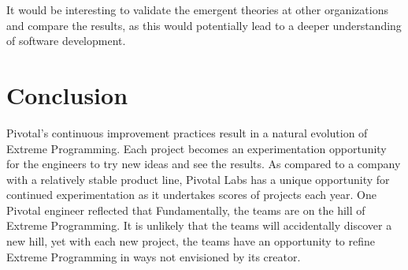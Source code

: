 It would be interesting to validate the emergent theories at other organizations and compare the results, as this would potentially lead to a deeper understanding of software development. 
\section{Conclusion}
Pivotal's continuous improvement practices result in a natural evolution of Extreme Programming.  Each project becomes an experimentation opportunity for the engineers to try new ideas and see the results. As compared to a company with a relatively stable product line, Pivotal Labs has a unique opportunity for continued experimentation as it undertakes scores of projects each year. One Pivotal engineer reflected that  Fundamentally, the teams are on the hill of Extreme Programming. It is unlikely that the teams will accidentally discover a new hill, yet with each new project, the teams have an opportunity to refine Extreme Programming in ways not envisioned by its creator. 




